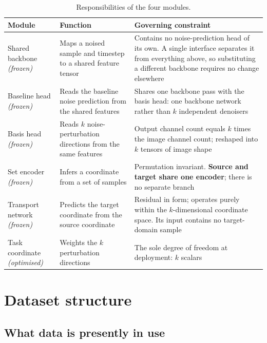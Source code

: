 \documentclass[11pt]{article}
\begin{document}
\begin{table}[htbp]
\centering\small
\begin{tabular}{@{}p{3.1cm}p{4.2cm}p{6.4cm}@{}}
\toprule
\textbf{Module} & \textbf{Function} & \textbf{Governing constraint} \\
\midrule
Shared backbone \textit{(frozen)}
  & Maps a noised sample and timestep to a shared feature tensor
  & Contains no noise-prediction head of its own. A single interface separates it from everything
    above, so substituting a different backbone requires no change elsewhere \\[2pt]
Baseline head \textit{(frozen)}
  & Reads the baseline noise prediction from the shared features
  & Shares one backbone pass with the basis head: one backbone network rather than $k$ independent
    denoisers \\[2pt]
Basis head \textit{(frozen)}
  & Reads $k$ noise-perturbation directions from the same features
  & Output channel count equals $k$ times the image channel count; reshaped into $k$ tensors of
    image shape \\[2pt]
Set encoder \textit{(frozen)}
  & Infers a coordinate from a set of samples
  & Permutation invariant. \textbf{Source and target share one encoder}; there is no separate branch \\[2pt]
Transport network \textit{(frozen)}
  & Predicts the target coordinate from the source coordinate
  & Residual in form; operates purely within the $k$-dimensional coordinate space. Its input
    contains no target-domain sample \\[2pt]
Task coordinate \textit{(optimised)}
  & Weights the $k$ perturbation directions
  & The sole degree of freedom at deployment: $k$ scalars \\
\bottomrule
\end{tabular}
\caption{Responsibilities of the four modules.}
\label{tab:modules}
\end{table}

\section{Dataset structure}
\label{sec:data}

\subsection{What data is presently in use}
\end{document}
